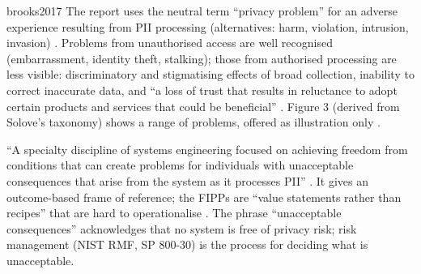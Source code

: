 \begin{papercard}{brooks2017}
 The report uses the neutral term ``privacy problem'' for an adverse experience resulting from PII processing (alternatives: harm, violation, intrusion, invasion) . Problems from unauthorised access are well recognised (embarrassment, identity theft, stalking); those from authorised processing are less visible: discriminatory and stigmatising effects of broad collection, inability to correct inaccurate data, and ``a loss of trust that results in reluctance to adopt certain products and services that could be beneficial'' . Figure 3 (derived from Solove's taxonomy) shows a range of problems, offered as illustration only .

 ``A specialty discipline of systems engineering focused on achieving freedom from conditions that can create problems for individuals with unacceptable consequences that arise from the system as it processes PII'' . It gives an outcome-based frame of reference; the FIPPs are ``value statements rather than recipes'' that are hard to operationalise . The phrase ``unacceptable consequences'' acknowledges that no system is free of privacy risk; risk management (NIST RMF, SP 800-30) is the process for deciding what is unacceptable.


\end{papercard}
